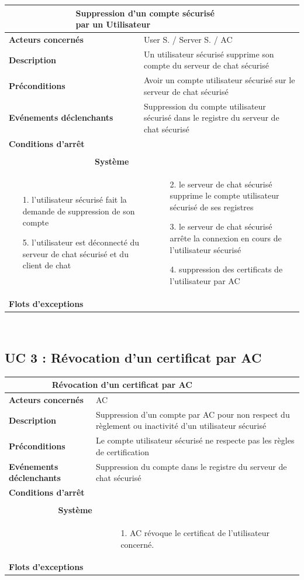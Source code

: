 \documentclass[a4paper,11pt,french]{article}
\newcommand{\fiche}[9] {
	\noindent
\begin{tabular}{|p{3.5cm}| p{1cm} | p{3cm} | p{.5cm} | p{7cm}|} 
\hline
\rowcolor{blue}
\multicolumn{2}{|l|}{\color{white}\bfseries{Nom}} & \multicolumn{3}{l|}{\color{white}\bfseries{#1}}\\
\hline
\multicolumn{2}{|l|}{\bfseries{Acteurs concernés}} & \multicolumn{3}{m{10.5cm}|}{#2}\\
\hline
\multicolumn{2}{|l|}{\bfseries{Description}} & \multicolumn{3}{m{10.5cm}|}{#3}\\
\hline
\multicolumn{2}{|l|}{\bfseries{Préconditions}} & \multicolumn{3}{m{10.5cm}|}{#4}\\
\hline
\multicolumn{2}{|l|}{\bfseries{Evénements déclenchants}} & \multicolumn{3}{m{10.5cm}|}{#5}\\
\hline
\multicolumn{2}{|l|}{\bfseries{Conditions d'arrêt}} & \multicolumn{3}{m{10.5cm}|}{#6}\\
\hline
\rowcolor{gray}
\multicolumn{5}{|c|}{\bfseries{Description du flot d'événements principal}}\\
\hline
\rowcolor{gray}
\multicolumn{3}{|c|}{\bfseries{Acteur(s)}} & \multicolumn{2}{c|}{\bfseries{Système}}\\
\hline
\multicolumn{3}{|p{7.5cm}|}{#7} & \multicolumn{2}{p{7.5cm}|}{#8}\\
\hline
\multicolumn{2}{|l}{\bfseries{Flots d'exceptions}} & \multicolumn{3}{|p{11.5cm}|}{#9}\\
\hline
\end{tabular}
\\
}
\begin{document}
\fiche
	{Suppression d’un compte sécurisé par un Utilisateur} %
	{User S. / Server S. / AC} %
	{Un utilisateur sécurisé supprime son compte du serveur de chat sécurisé} %
	{Avoir un compte utilisateur sécurisé sur le serveur de chat sécurisé} %
	{Suppression du compte utilisateur sécurisé dans le registre du serveur de chat sécurisé} %
	{} %
	{\begin{itemize}  %
		\item [1.] l’utilisateur sécurisé fait la demande de suppression de son compte
		\item []
		\item []
		\item []
		\item []
		\item []
		\item [5.] l’utilisateur est déconnecté du serveur de chat sécurisé et du client de chat
	 \end{itemize}
	} 
	{\begin{itemize}  %
		\item []
		\item []
		\item [2.] le serveur de chat sécurisé supprime le compte utilisateur sécurisé de ses registres
		\item [3.] le serveur de chat sécurisé arrête la connexion en cours de l’utilisateur sécurisé
		\item [4.] suppression des certificats de l’utilisateur par AC
	 \end{itemize}
	 }
	{} %

\subsection{UC 3 : Révocation d’un certificat par AC}

\fiche
	{Révocation d’un certificat par AC} %
	{AC} %
	{Suppression d’un compte par AC pour non respect du règlement ou inactivité d’un utilisateur sécurisé} %
	{Le compte utilisateur sécurisé ne respecte pas les règles de certification} %
	{Suppression du compte dans le registre du serveur de chat sécurisé} %
	{} %
	{\begin{itemize}  %
		\item [] 
	 \end{itemize}
	} 
	{\begin{itemize}  %
		\item [1.] AC révoque le certificat de l'utilisateur concerné.
	 \end{itemize}
	 }
	{} %
\end{document}
